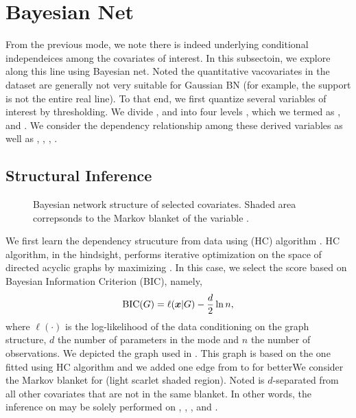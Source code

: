 \section{Bayesian Net} \label{sec:bn}

	From the previous mode, we note there is indeed underlying conditional
	independeices among the covariates of interest. In this subsectoin,
	we explore along this line using Bayesian net. Noted the quantitative vacovariates in the dataset
	are generally not very suitable for Gaussian BN (for example, the support is not the entire real line).
	To that end, we first quantize several variables of interest by thresholding. We divide , 
	and  into four levels , which we termed as ,
	 and . We consider the dependency
	relationship among these derived variables as well as , , ,
	.

	\subsection{Structural Inference}

		\begin{figure}[tpb]
			\centering
			\def\svgwidth{0.8\textwidth}
			\resizebox{0.6\textwidth}{!}{%
			    }
			\caption{Bayesian network structure of selected covariates. Shaded area correpsonds to the Markov blanket of the variable .}
			\label{fig:bn}
		\end{figure}

		We first learn the dependency strucuture from data using  (HC) algorithm \cite{Tsa:2006:HC}.
		HC algorithm, in the hindsight, performs iterative optimization on the space of directed acyclic graphs
		by maximizing . In this case, we select the score
		based on Bayesian Information Criterion (BIC), namely,
		\begin{equation} \label{eq:bn_bic}
		\begin{aligned}
			\mathrm{BIC}(G) = \ell({\boldsymbol x} \vert G) - \frac{d}{2} \ln n,
		\end{aligned}
		\end{equation}
		where $\ell(\cdot)$ is the log-likelihood of the data conditioning on the graph
		structure, $d$ the number of parameters in the mode and $n$ the number of observations.
		We depicted the graph used in . This graph is based on the one
		fitted using HC algorithm and we added one edge from  to  for betterWe consider the Markov blanket
		for  (light scarlet shaded region). Noted  is $d$-separated
		from all other covariates that are not in the same blanket. In other words, the inference
		on  may be solely performed on , , ,
		 and .

